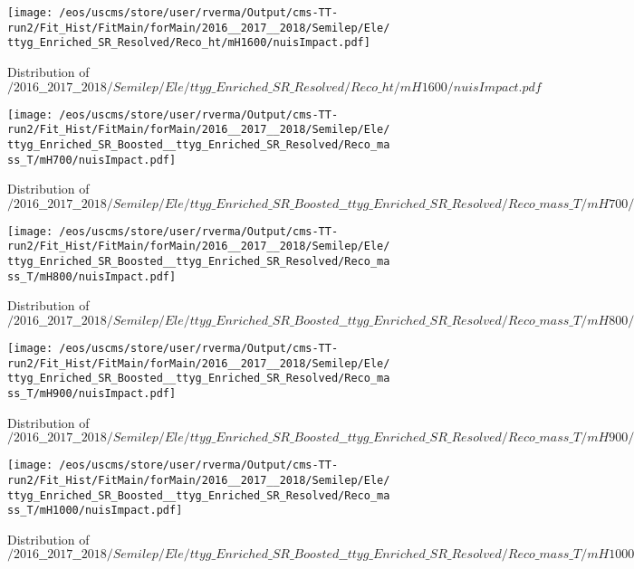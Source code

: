 \begin{figure}
\centering
\texttt{[image: /eos/uscms/store/user/rverma/Output/cms-TT-run2/Fit\_Hist/FitMain/forMain/2016\_\_2017\_\_2018/Semilep/Ele/ttyg\_Enriched\_SR\_Resolved/Reco\_ht/mH1600/nuisImpact.pdf]}
\caption{Distribution of $/2016\_\_2017\_\_2018/Semilep/Ele/ttyg\_Enriched\_SR\_Resolved/Reco\_ht/mH1600/nuisImpact.pdf$}
\end{figure}

\begin{figure}
\centering
\texttt{[image: /eos/uscms/store/user/rverma/Output/cms-TT-run2/Fit\_Hist/FitMain/forMain/2016\_\_2017\_\_2018/Semilep/Ele/ttyg\_Enriched\_SR\_Boosted\_\_ttyg\_Enriched\_SR\_Resolved/Reco\_mass\_T/mH700/nuisImpact.pdf]}
\caption{Distribution of $/2016\_\_2017\_\_2018/Semilep/Ele/ttyg\_Enriched\_SR\_Boosted\_\_ttyg\_Enriched\_SR\_Resolved/Reco\_mass\_T/mH700/nuisImpact.pdf$}
\end{figure}

\begin{figure}
\centering
\texttt{[image: /eos/uscms/store/user/rverma/Output/cms-TT-run2/Fit\_Hist/FitMain/forMain/2016\_\_2017\_\_2018/Semilep/Ele/ttyg\_Enriched\_SR\_Boosted\_\_ttyg\_Enriched\_SR\_Resolved/Reco\_mass\_T/mH800/nuisImpact.pdf]}
\caption{Distribution of $/2016\_\_2017\_\_2018/Semilep/Ele/ttyg\_Enriched\_SR\_Boosted\_\_ttyg\_Enriched\_SR\_Resolved/Reco\_mass\_T/mH800/nuisImpact.pdf$}
\end{figure}

\begin{figure}
\centering
\texttt{[image: /eos/uscms/store/user/rverma/Output/cms-TT-run2/Fit\_Hist/FitMain/forMain/2016\_\_2017\_\_2018/Semilep/Ele/ttyg\_Enriched\_SR\_Boosted\_\_ttyg\_Enriched\_SR\_Resolved/Reco\_mass\_T/mH900/nuisImpact.pdf]}
\caption{Distribution of $/2016\_\_2017\_\_2018/Semilep/Ele/ttyg\_Enriched\_SR\_Boosted\_\_ttyg\_Enriched\_SR\_Resolved/Reco\_mass\_T/mH900/nuisImpact.pdf$}
\end{figure}

\begin{figure}
\centering
\texttt{[image: /eos/uscms/store/user/rverma/Output/cms-TT-run2/Fit\_Hist/FitMain/forMain/2016\_\_2017\_\_2018/Semilep/Ele/ttyg\_Enriched\_SR\_Boosted\_\_ttyg\_Enriched\_SR\_Resolved/Reco\_mass\_T/mH1000/nuisImpact.pdf]}
\caption{Distribution of $/2016\_\_2017\_\_2018/Semilep/Ele/ttyg\_Enriched\_SR\_Boosted\_\_ttyg\_Enriched\_SR\_Resolved/Reco\_mass\_T/mH1000/nuisImpact.pdf$}
\end{figure}

